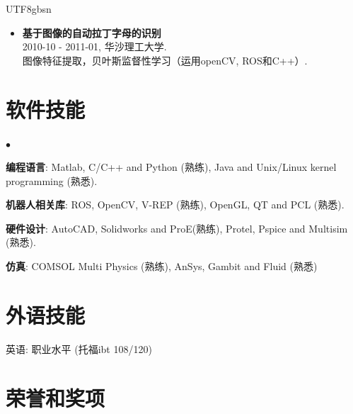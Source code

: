 \documentclass[margin,line]{res}
\newenvironment{list2}{
  \begin{list}{$\bullet$}{%
      \setlength{\itemsep}{0in}
      \setlength{\parsep}{0in} \setlength{\parskip}{0in}
      \setlength{\topsep}{0in} \setlength{\partopsep}{0in} 
      \setlength{\leftmargin}{0.2in}}}{\end{list}}
\begin{document}
\begin{CJK*}{UTF8}{gbsn}
\begin{resume}
\begin{itemize}
%
\item {\bf 基于图像的自动拉丁字母的识别}\\
2010-10 - 2011-01, 华沙理工大学.\\
图像特征提取，贝叶斯监督性学习（运用openCV, ROS和C++）.\\

\end{itemize}



\section{\sc 软件技能} 
\begin{list2}
\item {\bf 编程语言}: Matlab, C/C++ and Python (熟练), Java and Unix/Linux kernel programming (熟悉). \\

\item {\bf 机器人相关库}: ROS, OpenCV, V-REP (熟练), OpenGL, QT and PCL (熟悉).\\

\item {\bf 硬件设计}: AutoCAD, Solidworks and ProE(熟练), Protel, Pspice and Multisim (熟悉).\\

\item {\bf 仿真}: COMSOL Multi Physics (熟练), AnSys, Gambit and Fluid (熟悉) \\
\end{list2}




\section{\sc 外语技能} 
英语: 职业水平 (托福ibt 108/120)\\

\section{\sc 荣誉和奖项} 
\begin{itemize}


\end{itemize}
\end{resume}
\end{CJK*}
\end{document}
